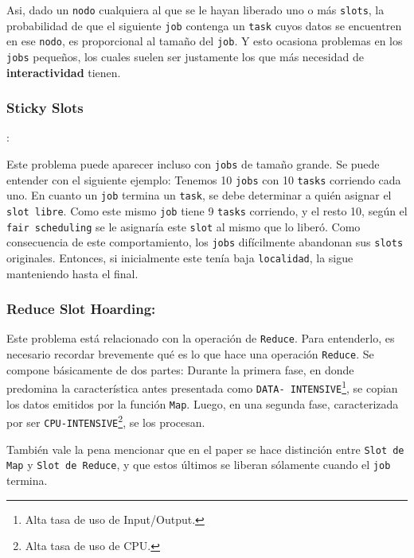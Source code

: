 \documentclass[11pt, a4paper, twoside]{article}
\begin{document}
Asi, dado un \texttt{nodo} cualquiera al que se le hayan liberado uno o más
\texttt{slots}, la probabilidad de que el siguiente \texttt{job} contenga un
\texttt{task} cuyos datos se encuentren en ese \texttt{nodo}, es proporcional al
tamaño del \texttt{job}. Y esto ocasiona problemas en los \texttt{jobs}
pequeños, los cuales suelen ser justamente los que más necesidad de
\textbf{interactividad} tienen.


\subsubsection{Sticky Slots}:

Este problema puede aparecer incluso con \texttt{jobs} de tamaño grande. Se
puede entender con el siguiente ejemplo: Tenemos 10 \texttt{jobs} con 10
\texttt{tasks} corriendo cada uno. En cuanto un \texttt{job} termina un
\texttt{task}, se debe determinar a quién asignar el \texttt{slot libre}. Como
este mismo \texttt{job} tiene 9 \texttt{tasks} corriendo, y el resto 10, según
el \texttt{fair scheduling} se le asignaría este \texttt{slot} al mismo que lo
liberó. Como consecuencia de este comportamiento, los \texttt{jobs} difícilmente
abandonan sus \texttt{slots} originales. Entonces, si inicialmente este tenía
baja \texttt{localidad}, la sigue manteniendo hasta el final.


\subsubsection{Reduce Slot Hoarding:}

Este problema está relacionado con la operación de \texttt{Reduce}. Para
entenderlo, es necesario recordar brevemente qué es lo que hace una operación
\texttt{Reduce}. Se compone básicamente de dos partes: Durante la primera fase,
en donde predomina la característica antes presentada como \texttt{DATA-
INTENSIVE}\footnote{Alta tasa de uso de Input/Output.}, se copian los datos
emitidos por la función \texttt{Map}. Luego, en una segunda fase, caracterizada
por ser \texttt{CPU-INTENSIVE}\footnote{Alta tasa de uso de CPU.}, se los
procesan.

También vale la pena mencionar que en el paper se hace distinción entre
\texttt{Slot de Map} y \texttt{Slot de Reduce}, y que estos últimos se liberan
sólamente cuando el \texttt{job} termina.
\end{document}
